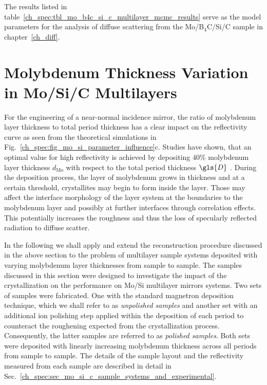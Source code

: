 The results listed in table~\ref{ch_spec:tbl_mo_b4c_si_c_multilayer_mcmc_results} serve as the model parameters for the analysis of diffuse scattering from the Mo/B$_4$C/Si/C sample in chapter~\ref{ch_diff}.

\section{Molybdenum Thickness Variation in Mo/Si/C Multilayers} \label{ch_spec:sec_mo_si_c}
For the engineering of a near-normal incidence mirror, the ratio of molybdenum layer thickness to total period thickness has a clear impact on the reflectivity curve as seen from the theoretical simulations in Fig.~\ref{ch_spec:fig_mo_si_parameter_influence}c. Studies have shown, that an optimal value for high reflectivity is achieved by depositing $40\%$ molybdenum layer thickness $d_\text{Mo}$ with respect to the total period thickness $\gls{D}$ \cite{bajt_investigation_2001,braun_mo/si_2002}. During the deposition process, the layer of molybdenum grows in thickness and at a certain threshold, crystallites may begin to form \cite{verhoeven_ion_1992,bajt_investigation_2001} inside the layer. Those may affect the interface morphology of the layer system at the boundaries to the molybdenum layer and possibly at further interfaces through correlation effects. This potentially increases the roughness and thus the loss of specularly reflected radiation to diffuse scatter.

In the following we shall apply and extend the reconstruction procedure discussed in the above section to the problem of multilayer sample systems deposited with varying molybdenum layer thicknesses from sample to sample. The samples discussed in this section were designed to investigate the impact of the crystallization on the performance on Mo/Si multilayer mirrors systems. Two sets of samples were fabricated. One with the standard magnetron deposition technique, which we shall refer to as \emph{unpolished samples} and another set with an additional ion polishing step applied within the deposition of each period to counteract the roughening expected from the crystallization process. Consequently, the latter samples are referred to as \emph{polished samples}. Both sets were deposited with linearly increasing molybdenum thickness across all periods from sample to sample. The details of the sample layout and the reflectivity measured from each sample are described in detail in Sec.~\ref{ch_spec:sec_mo_si_c_sample_systems_and_experimental}. 

